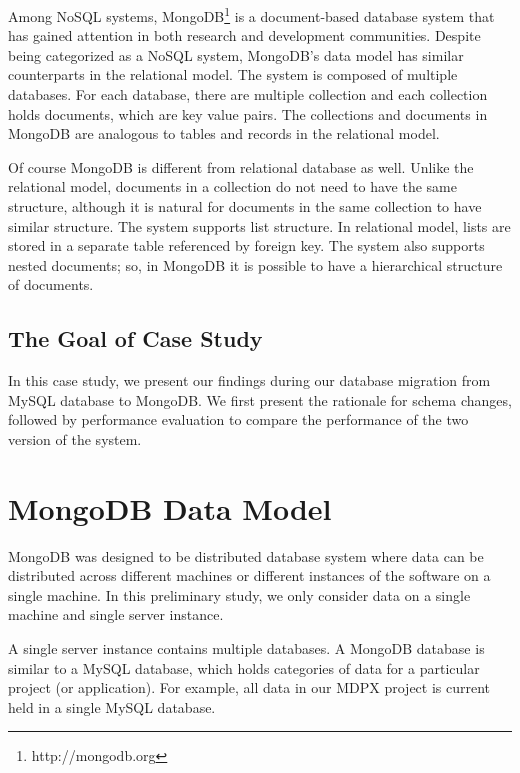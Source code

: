Among NoSQL systems, MongoDB\footnote{http://mongodb.org} is a document-based database system that has gained attention in both research and development communities. Despite being categorized as a NoSQL system, MongoDB's data model has similar counterparts in the relational model. The system is composed of multiple databases. For each database, there are multiple collection and each collection holds documents, which are key value pairs. The collections and documents in MongoDB are analogous to tables and records in the relational model.

Of course MongoDB is different from relational database as well. Unlike the relational model, documents in a collection do not need to have the same structure, although it is natural for documents in the same collection to have similar structure. The system supports list structure. In relational model, lists are stored in a separate table referenced by foreign key. The system also supports nested documents; so, in MongoDB it is possible to have a hierarchical structure of documents.

\subsection{The Goal of Case Study}

In this case study, we present our findings during our database migration from MySQL database to MongoDB. We first present the rationale for schema changes, followed by performance evaluation to compare the performance of the two version of the system.



\section{MongoDB Data Model}

MongoDB was designed to be distributed database system where data can be distributed across different machines or different instances of the software on a single machine. In this preliminary study, we only consider data on a single machine and single server instance.

A single server instance contains multiple databases. A MongoDB database is similar to a MySQL database, which holds categories of data for a particular project (or application). For example, all data in our MDPX project is current held in a single MySQL database.

